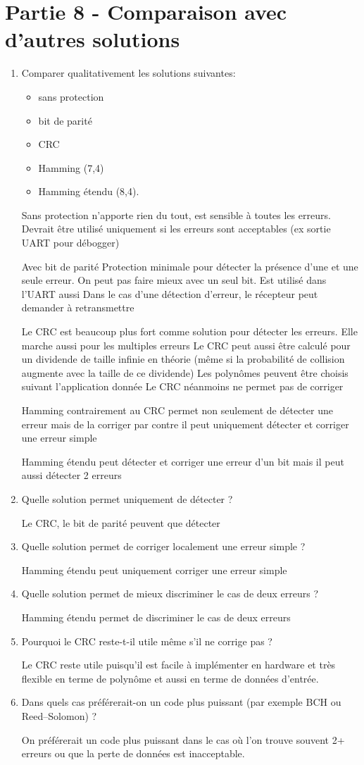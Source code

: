 \documentclass{article}
\begin{document}
\section{Partie 8 - Comparaison avec d'autres solutions}
\begin{enumerate}
\item Comparer qualitativement les solutions suivantes:

\begin{itemize}
\item sans protection
\item bit de parité
\item CRC
\item Hamming (7,4)
\item Hamming étendu (8,4).
\end{itemize}
Sans protection n'apporte rien du tout, est sensible à toutes les erreurs.
Devrait être utilisé uniquement si les erreurs sont acceptables (ex sortie UART pour débogger)

Avec bit de parité
Protection minimale pour détecter la présence d'une et une seule erreur. On peut pas faire mieux avec un seul bit.
Est utilisé dans l'UART aussi
Dans le cas d'une détection d'erreur, le récepteur peut demander à retransmettre

Le CRC est beaucoup plus fort comme solution pour détecter les erreurs. Elle marche aussi pour les multiples erreurs
Le CRC peut aussi être calculé pour un dividende de taille infinie en théorie (même si la probabilité
de collision augmente avec la taille de ce dividende)
Les polynômes peuvent être choisis suivant l'application donnée
Le CRC néanmoins ne permet pas de corriger

Hamming contrairement au CRC permet non seulement de détecter une erreur mais de la corriger
par contre il peut uniquement détecter et corriger une erreur simple

Hamming étendu peut détecter et corriger une erreur d'un bit mais il peut aussi détecter 2 erreurs
\item Quelle solution permet uniquement de détecter ? 

Le CRC, le bit de parité peuvent que détecter
\item Quelle solution permet de corriger localement une erreur simple ? 

Hamming étendu peut uniquement corriger une erreur simple
\item Quelle solution permet de mieux discriminer le cas de deux erreurs ? 

Hamming étendu permet de discriminer le cas de deux erreurs
\item Pourquoi le CRC reste-t-il utile même s’il ne corrige pas ? 

Le CRC reste utile puisqu'il est facile à implémenter en hardware et très flexible en terme de polynôme
et aussi en terme de données d'entrée.
\item Dans quels cas préférerait-on un code plus puissant (par exemple BCH ou Reed–Solomon) ?

On préférerait un code plus puissant dans le cas où l'on trouve souvent 2+ erreurs ou que la perte de données est inacceptable.
\end{enumerate}
\end{document}
